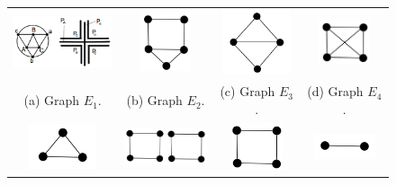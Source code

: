 \documentclass{dmgt}
\begin{document}
%
 \begin{figure}[htb]	
 
   \centering
  \begin{tabular}{  c c c c }
    \includegraphics[width=3cm]{octaedro.png} 
    & 
    \includegraphics[width=1.5cm]{ex3.png} 
    & 
    \includegraphics[width=2cm]{diamondNoLabel.png} 
    & 
    \includegraphics[width=1.5cm]{k4.png} 
    \\
    \footnotesize (a)  Graph $E_1$. 
    & 
    \footnotesize (b) Graph $E_2$.
    & 
    \footnotesize (c) Graph $E_3$.
    & 
    \footnotesize (d) Graph $E_4$.
    \\%
    \includegraphics[width=2cm]{k3.png} 
    &
    \includegraphics[width=2.5cm]{2c4.png} 
    & 
    \includegraphics[width=1.5cm]{c4e.png} 
    & 
    \includegraphics[width=1.8cm]{k2.png} 
    \\ %
    

\end{tabular}
\end{figure}
\end{document}
